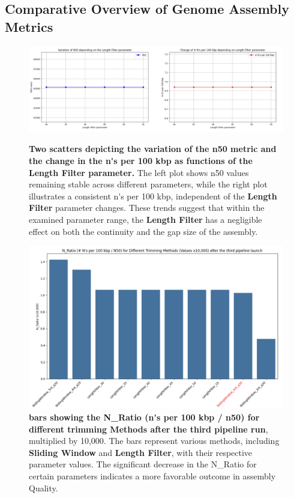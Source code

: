 \subsection{Comparative Overview of Genome Assembly Metrics}

\begin{figure}[H]
    \centering
    \includegraphics[width=0.7\linewidth]{resources/images/length_filter_variation_2.png}
    \caption{\textbf{Two \gls{scatter}s depicting the variation of the \gls{n50} metric and the change in the \gls{n's per 100 kbp} as functions of the Length Filter parameter.} The left plot shows \gls{n50} values remaining stable across different parameters, while the right plot illustrates a consistent \gls{n's per 100 kbp}, independent of the \textbf{Length Filter} parameter changes. These trends suggest that within the examined parameter range, the \textbf{Length Filter} has a negligible effect on both the continuity and the gap size of the \gls{assembly}.}
    \label{fig:length_filter_variation_2}
    
    \vspace{1cm}
    
    \includegraphics[width=0.7\linewidth]{resources/images/n_ratio_3.png}
    \caption{\textbf{\gls{bar}s showing the N\_Ratio (\gls{n's per 100 kbp} / \gls{n50}) for different \gls{trimming} Methods after the third pipeline run}, multiplied by 10,000. The bars represent various methods, including \textbf{Sliding Window} and \textbf{Length Filter}, with their respective parameter values. The significant decrease in the N\_Ratio for certain parameters indicates a more favorable outcome in \gls{assembly} Quality.}
    \label{fig:n_ratio_3}
\end{figure}



